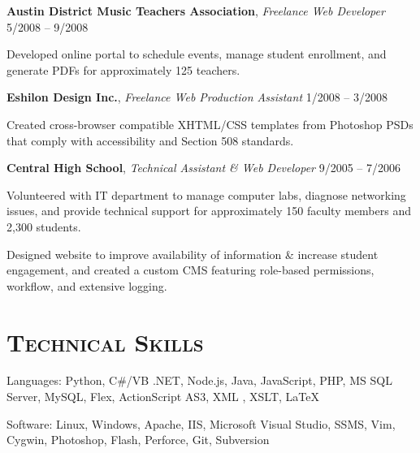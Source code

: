 \documentclass[12pt,a4paper]{article}
\newcommand{\sectionhead}{\normalfont\normalsize\scshape}
\newcommand{\workhead}[3]{\textbf{#1}, \emph{#2} \hfill #3}
\newcommand{\li}{\item[--]}
\begin{document}
\begin{description}[leftmargin=0em]
    \item
        \workhead{Austin District Music Teachers Association}{Freelance Web Developer}{5/2008 -- 9/2008}
        \begin{itemize*}
            \li Developed online portal to schedule events, manage student enrollment, and generate PDFs for approximately 125 teachers.
        \end{itemize*}

    \item
        \workhead{Eshilon Design Inc.}{Freelance Web Production Assistant}{1/2008 -- 3/2008}
        \begin{itemize*}
            \li Created cross-browser compatible XHTML/CSS templates from Photoshop PSDs that comply with accessibility and Section 508 standards.
        \end{itemize*}

    \item
        \workhead{Central High School}{Technical Assistant \& Web Developer}{9/2005 -- 7/2006}
        \begin{itemize*}
            \li Volunteered with IT department to manage computer labs, diagnose networking issues, and provide technical support for approximately 150 faculty members and 2,300 
students.
            \li Designed website to improve availability of information \& increase student engagement, and created a custom CMS featuring role-based permissions, workflow, and extensive logging.
        \end{itemize*}
\end{description}

\section*{\sectionhead Technical Skills}
\begin{description*}
    \item Languages: Python, C\#/VB .NET, Node.js, Java, JavaScript, PHP, MS SQL Server, MySQL, Flex, ActionScript AS3, XML \Smiley, XSLT, \LaTeX
    \item Software: Linux, Windows, Apache, IIS, Microsoft Visual Studio, SSMS, Vim, Cygwin, Photoshop, Flash, Perforce, Git, Subversion
\end{description*}
\end{document}
